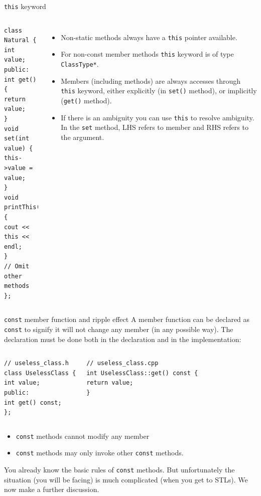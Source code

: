 \begin{frame}[fragile]{\texttt{this} keyword}
\begin{columns}[]

\vspace{-.3in}
\begin{verbatim}
class Natural {
int value;
public:
int get() { 
return value;
}
void set(int value) {
this->value = value;
}
void printThis() {
cout << this << endl;
}
// Omit other methods
};
\end{verbatim}

\vspace{-.2in}
\begin{itemize}
\item Non-static methods always have a \texttt{this} pointer available.
\item For non-const member methods \texttt{this} keyword is of type \texttt{ClassType*}.
\item Members (including methods) are \alert{always} accesses through \texttt{this} keyword, either explicitly (in \texttt{set()} method), or implicitly (\texttt{get()} method).
\item If there is an ambiguity you can use \texttt{this} to resolve ambiguity. In the \texttt{set} method, LHS refers to member and RHS refers to the argument.
\end{itemize}
\end{columns}
\end{frame}

\begin{frame}[fragile]{\texttt{const} member function and ripple effect}
A member function can be declared as \texttt{const} to signify it will not change any member (in any possible way). The declaration must be done both in the declaration and in the implementation:

\begin{columns}

\vspace{-.25in}
\begin{verbatim}
// useless_class.h
class UselessClass {
int value;
public:
int get() const;
};
\end{verbatim}


\vspace{-.25in}
\begin{verbatim}
// useless_class.cpp
int UselessClass::get() const {
return value;
}
\end{verbatim}
\end{columns}

\begin{itemize}
\item \texttt{const} methods cannot modify any member
\item \texttt{const} methods may only invoke other \texttt{const} methods.
\end{itemize}
You already know the basic rules of \texttt{const} methods. But unfortunately the situation (you will be facing) is much complicated (when you get to STLs). We now make a further discussion. 
\end{frame}


